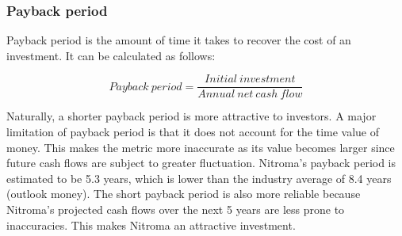 

\subsubsection{Payback period}
\label{sec:pby}
Payback period is the amount of time it takes to recover the cost of an investment. It can be calculated as follows:

\begin{equation}
\label{eqn:payback}
    Payback\:period = \frac{Initial\:investment}{Annual\:net\:cash\:flow}
\end{equation}

Naturally, a shorter payback period is more attractive to investors. A major limitation of payback period is that it does not account for the time value of money. This makes the metric more inaccurate as its value becomes larger since future cash flows are subject to greater fluctuation. Nitroma’s payback period is estimated to be 5.3 years, which is lower than the industry average of 8.4 years (outlook money).  The short payback period is also more reliable because Nitroma’s projected cash flows over the next 5 years are less prone to inaccuracies. This makes Nitroma an attractive investment. 


